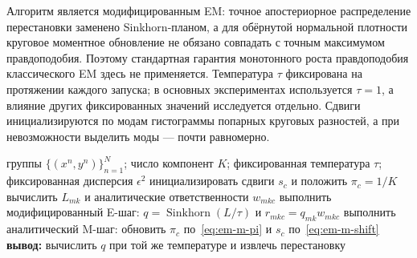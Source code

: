 Алгоритм является модифицированным EM: точное апостериорное распределение перестановки
заменено Sinkhorn-планом, а для обёрнутой нормальной плотности круговое моментное обновление
не обязано совпадать с точным максимумом правдоподобия. Поэтому стандартная гарантия
монотонного роста правдоподобия классического EM здесь не применяется. Температура $\tau$
фиксирована на протяжении каждого запуска; в основных экспериментах используется
$\tau=1$, а влияние других фиксированных значений исследуется отдельно. Сдвиги
инициализируются по модам гистограммы попарных круговых разностей, а при невозможности
выделить моды --- почти равномерно.

\begin{algorithm}[H]
\caption{Модифицированный EM для глобальной смеси сдвигов}
\label{alg:em}
\begin{algorithmic}[1]
\Require группы $\{(x^n,y^n)\}_{n=1}^{N}$; число компонент $K$; фиксированная
температура $\tau$; фиксированная дисперсия $\epsilon^2$
\State инициализировать сдвиги $s_c$ и положить $\pi_c=1/K$
  \State вычислить $L_{mk}$ и аналитические ответственности $w_{mkc}$
  \State выполнить модифицированный E-шаг:
  $q=\operatorname{Sinkhorn}(L/\tau)$ и $r_{mkc}=q_{mk}w_{mkc}$
  \State выполнить аналитический M-шаг: обновить $\pi_c$ по~\eqref{eq:em-m-pi}
  и $s_c$ по~\eqref{eq:em-m-shift}
\EndFor
\State \textbf{вывод:} вычислить $q$ при той же температуре и извлечь перестановку
\end{algorithmic}
\end{algorithm}
